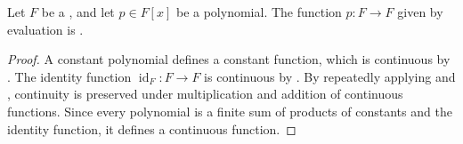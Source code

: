 \begin{proposition} \label{proposition:polynomial_function_over_topological_field_is_continuous}
    Let $F$ be a , and let $p \in F[x]$ be a polynomial. The function $p : F \to F$ given by evaluation is .
\end{proposition}
\begin{proof}
    A constant polynomial defines a constant function, which is continuous by . The identity function $\operatorname{id}_F : F \to F$ is continuous by . By repeatedly applying  and , continuity is preserved under multiplication and addition of continuous functions. Since every polynomial is a finite sum of products of constants and the identity function, it defines a continuous function.
\end{proof}
